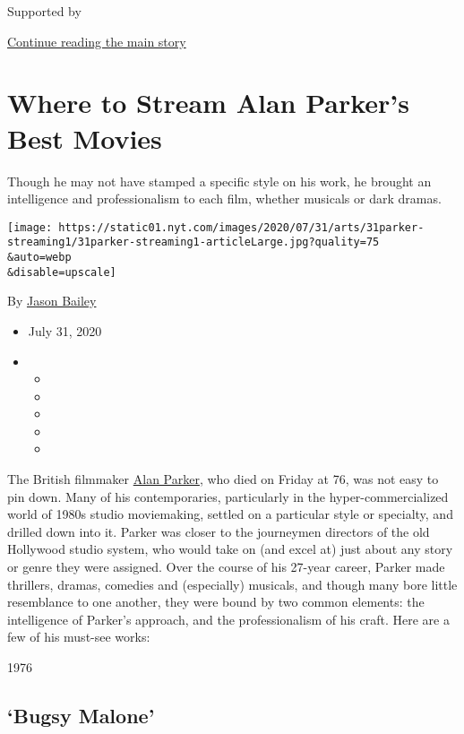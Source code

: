Supported by

\protect\hyperlink{after-sponsor}{Continue reading the main story}

\hypertarget{where-to-stream-alan-parkers-best-movies}{%
\section{Where to Stream Alan Parker's Best
Movies}\label{where-to-stream-alan-parkers-best-movies}}

Though he may not have stamped a specific style on his work, he brought
an intelligence and professionalism to each film, whether musicals or
dark dramas.

\texttt{[image: https://static01.nyt.com/images/2020/07/31/arts/31parker-streaming1/31parker-streaming1-articleLarge.jpg?quality=75\\\&auto=webp\\\&disable=upscale]}

By \href{https://www.nytimes.com/by/jason-bailey}{Jason Bailey}

\begin{itemize}
\item
  July 31, 2020
\item
  \begin{itemize}
  \item
  \item
  \item
  \item
  \item
  \end{itemize}
\end{itemize}

The British filmmaker
\href{https://www.nytimes.com/2020/07/31/movies/alan-parker-versatile-film-director-is-dead-at-76.html}{Alan
Parker}, who died on Friday at 76, was not easy to pin down. Many of his
contemporaries, particularly in the hyper-commercialized world of 1980s
studio moviemaking, settled on a particular style or specialty, and
drilled down into it. Parker was closer to the journeymen directors of
the old Hollywood studio system, who would take on (and excel at) just
about any story or genre they were assigned. Over the course of his
27-year career, Parker made thrillers, dramas, comedies and (especially)
musicals, and though many bore little resemblance to one another, they
were bound by two common elements: the intelligence of Parker's
approach, and the professionalism of his craft. Here are a few of his
must-see works:

1976

\hypertarget{bugsy-malone}{%
\subsection{`Bugsy Malone'}\label{bugsy-malone}}

